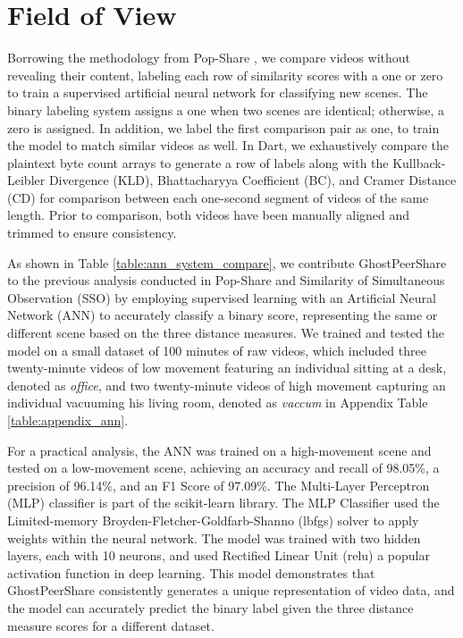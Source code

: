 \section{Field of View}
\label{sec:Field of View}
Borrowing the methodology from Pop-Share \cite{Lagesse2021-PopShare}, we compare videos without revealing their content, labeling each row of similarity scores with a one or zero to train a supervised artificial neural network for classifying new scenes. The binary labeling system assigns a one when two scenes are identical; otherwise, a zero is assigned. In addition, we label the first comparison pair as one, to train the model to match similar videos as well. In Dart, we exhaustively compare the plaintext byte count arrays to generate a row of labels along with the Kullback-Leibler Divergence (KLD), Bhattacharyya Coefficient (BC), and Cramer Distance (CD) for comparison between each one-second segment of videos of the same length. Prior to comparison, both videos have been manually aligned and trimmed to ensure consistency.



As shown in Table \ref{table:ann_system_compare}, we contribute GhostPeerShare to the previous analysis conducted in Pop-Share and Similarity of Simultaneous Observation (SSO) \cite{Wu2019-SSO} by employing supervised learning with an Artificial Neural Network (ANN) to accurately classify a binary score, representing the same or different scene based on the three distance measures. We trained and tested the model on a small dataset of 100 minutes of raw videos, which included three twenty-minute videos of low movement featuring an individual sitting at a desk, denoted as \textit{office}, and two twenty-minute videos of high movement capturing an individual vacuuming his living room, denoted as \textit{vaccum} in Appendix Table \ref{table:appendix_ann}.

For a practical analysis, the ANN was trained on a high-movement scene and tested on a low-movement scene, achieving an accuracy and recall of 98.05\%, a precision of 96.14\%, and an F1 Score of 97.09\%. The Multi-Layer Perceptron (MLP) classifier is part of the scikit-learn \cite{scikit-learn} library. The MLP Classifier used the Limited-memory Broyden-Fletcher-Goldfarb-Shanno (lbfgs) solver to apply weights within the neural network. The model was trained with two hidden layers, each with 10 neurons, and used Rectified Linear Unit (relu) a popular activation function in deep learning. This model demonstrates that GhostPeerShare consistently generates a unique representation of video data, and the model can accurately predict the binary label given the three distance measure scores for a different dataset.
